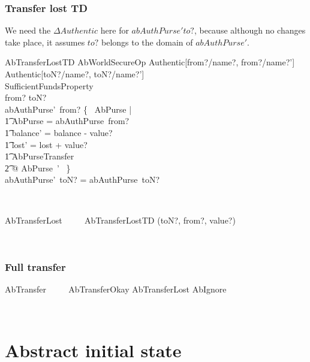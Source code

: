 \subsubsection{Transfer lost TD}

We need the $\Delta Authentic$ here for $abAuthPurse' to?$,
because although no changes take place, it assumes $to?$ belongs
to the domain of $abAuthPurse'$.
%
\begin{LSDef}
\begin{schema}{AbTransferLostTD}
  AbWorldSecureOp
\where
  \Delta Authentic[from?/name?, from?/name?']\\
  \Delta Authentic[toN?/name?, toN?/name?']\\
  SufficientFundsProperty\\
  from? \neq toN?\\
  abAuthPurse'~from? \in \{~ \Delta AbPurse | \\
      \t1 \theta AbPurse = abAuthPurse~from? \\
      \t1 \land balance' = balance - value? \\
      \t1 \land lost' = lost + value? \\
      \t1 \land \Xi AbPurseTransfer \\
      \t2 @ \theta AbPurse~' ~\}\\
  abAuthPurse'~toN? = abAuthPurse~toN?
\end{schema}~\end{LSDef}

\begin{LSDef}
\begin{zed}
   AbTransferLost ~~~~ AbTransferLostTD \hide (toN?, from?, value?)
\end{zed}~\end{LSDef}

\subsubsection{Full transfer}

\begin{LSDef}
\begin{zed}
   AbTransfer ~~~~ AbTransferOkay \lor AbTransferLost \lor AbIgnore
\end{zed}~\end{LSDef}

\section{Abstract initial state}

